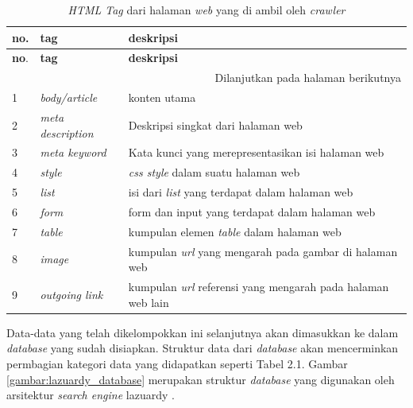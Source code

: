   \begin{center}
    \begin{longtable}{ |p{1cm}|p{3cm}|p{7cm}| }
      \caption{\emph{HTML Tag} dari halaman \emph{web} yang di ambil oleh \emph{crawler} \citep{lazuardithesis}} \\

      \hline \textbf{no}.& \textbf{tag}& \textbf{deskripsi} \\ \hline
      \endfirsthead

      \hline \textbf{no}.& \textbf{tag}& \textbf{deskripsi} \\ \hline
      \endhead

      \hline \multicolumn{3}{r}{{Dilanjutkan pada halaman berikutnya}} \\
      \endfoot

      \hline \hline
      \endlastfoot

      1& \emph{body/article}& konten utama \\ \hline
      2& \emph{meta description}& Deskripsi singkat dari halaman web \\ \hline
      3& \emph{meta keyword}& Kata kunci yang merepresentasikan isi halaman web \\ \hline
      4& \emph{style}& \emph{css style} dalam suatu halaman web \\ \hline
      5& \emph{list}& isi dari \emph{list} yang terdapat dalam halaman web \\ \hline
      6& \emph{form}& form dan input yang terdapat dalam halaman web \\ \hline
      7& \emph{table}& kumpulan elemen \emph{table} dalam halaman web \\ \hline
      8& \emph{image}& kumpulan \emph{url} yang mengarah pada gambar di halaman web \\ \hline
      9& \emph{outgoing link}& kumpulan \emph{url} referensi yang mengarah pada halaman web lain \\ \hline
    \end{longtable}
  \end{center}

  Data-data yang telah dikelompokkan ini selanjutnya akan dimasukkan ke dalam \emph{database} yang sudah disiapkan. Struktur data dari \emph{database} akan mencerminkan permbagian kategori data yang didapatkan seperti Tabel 2.1. Gambar \ref{gambar:lazuardy_database} merupakan struktur \emph{database} yang digunakan oleh arsitektur \emph{search engine} lazuardy \citep{lazuardithesis}.

